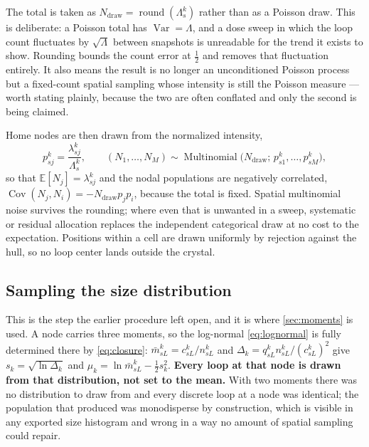 \documentclass{article}
\begin{document}
The total is taken as $N_{\mathrm{draw}}=\operatorname{round}(\Lambda^k_s)$
rather than as a Poisson draw. This is deliberate: a Poisson total has
$\operatorname{Var}=\Lambda$, and a dose sweep in which the loop count fluctuates
by $\sqrt\Lambda$ between snapshots is unreadable for the trend it exists to
show. Rounding bounds the count error at $\tfrac12$ and removes that fluctuation
entirely. It also means the result is no longer an unconditioned Poisson process
but a fixed-count spatial sampling whose intensity is still the Poisson measure
--- worth stating plainly, because the two are often conflated and only the
second is being claimed.

Home nodes are then drawn from the normalized intensity,
\begin{equation}
  p^k_{sj}=\frac{\lambda^k_{sj}}{\Lambda^k_s},
  \qquad
  (N_1,\dots,N_M)\sim\operatorname{Multinomial}\bigl(N_{\mathrm{draw}};\,
     p^k_{s1},\dots,p^k_{sM}\bigr),
  \label{eq:homenodes}
\end{equation}
so that $\mathbb E[N_j]=\lambda^k_{sj}$ and the nodal populations are negatively
correlated, $\operatorname{Cov}(N_j,N_i)=-N_{\mathrm{draw}}p_jp_i$, because the
total is fixed. Spatial multinomial noise survives the rounding; where even that
is unwanted in a sweep, systematic or residual allocation replaces the
independent categorical draw at no cost to the expectation. Positions within a
cell are drawn uniformly by rejection against the hull, so no loop center lands
outside the crystal.

\subsection{Sampling the size distribution}
\label{sec:sizesampling}

This is the step the earlier procedure left open, and it is where
\cref{sec:moments} is used. A node carries three moments, so the log-normal
\cref{eq:lognormal} is fully determined there by \cref{eq:closure}: $\bar
m^k_{sL}=c^k_{sL}/n^k_{sL}$ and $\Delta_k=q^k_{sL}n^k_{sL}/(c^k_{sL})^2$ give
$s_k=\sqrt{\ln\Delta_k}$ and $\mu_k=\ln\bar m^k_{sL}-\tfrac12s_k^2$.
\textbf{Every loop at that node is drawn from that distribution, not set to the
mean.} With two moments there was no distribution to draw from and every discrete
loop at a node was identical; the population that produced was monodisperse by
construction, which is visible in any exported size histogram and wrong in a way
no amount of spatial sampling could repair.
\end{document}
